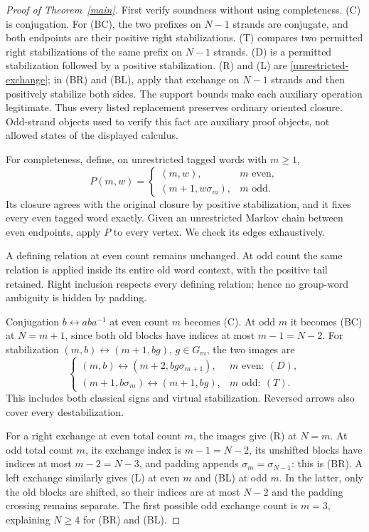 \documentclass[11pt]{article}
\newcommand{\sig}{\sigma}
\newcommand{\arr}{\longleftrightarrow}
\begin{document}
\begin{proof}[Proof of Theorem~\ref{main}]
First verify soundness without using completeness. (C) is conjugation.
For (BC), the two prefixes on $N-1$ strands are conjugate, and both endpoints
are their positive right stabilizations. (T) compares two permitted right
stabilizations of the same prefix on $N-1$ strands. (D) is a permitted
stabilization followed by a positive stabilization. (R) and (L) are
\eqref{unrestricted-exchange}; in (BR) and (BL), apply that exchange on
$N-1$ strands and then positively stabilize both sides. The support bounds make
each auxiliary operation legitimate. Thus every listed replacement preserves
ordinary oriented closure. Odd-strand objects used to verify this fact are
auxiliary proof objects, not allowed states of the displayed calculus.

For completeness, define, on unrestricted tagged words with $m\ge1$,
\begin{equation}\label{padding}
 P(m,w)=
 \begin{cases}
 (m,w),&m\text{ even},\\
 (m+1,w\sig_m),&m\text{ odd}.
 \end{cases}
\end{equation}
Its closure agrees with the original closure by positive stabilization, and it
fixes every even tagged word exactly. Given an unrestricted Markov chain between
even endpoints, apply $P$ to every vertex. We check its edges exhaustively.

A defining relation at even count remains unchanged. At odd count the same
relation is applied inside its entire old word context, with the positive tail
retained. Right inclusion respects every defining relation; hence no group-word
ambiguity is hidden by padding.

Conjugation $b\arr aba^{-1}$ at even count $m$ becomes (C).
At odd $m$ it becomes (BC) at $N=m+1$, since both old blocks have indices
at most $m-1=N-2$.
For stabilization $(m,b)\arr(m+1,bg)$, $g\in G_m$, the two images are
\[
 \begin{cases}
 (m,b)\arr(m+2,bg\sig_{m+1}),&m\text{ even}:\ (D),\\
 (m+1,b\sig_m)\arr(m+1,bg),&m\text{ odd}:\ (T).
 \end{cases}
\]
This includes both classical signs and virtual stabilization. Reversed arrows
also cover every destabilization.

For a right exchange at even total count $m$, the images give (R) at $N=m$.
At odd total count $m$, its exchange index is $m-1=N-2$, its unshifted blocks
have indices at most $m-2=N-3$, and padding appends $\sig_m=\sig_{N-1}$:
this is (BR). A left exchange similarly gives (L) at even $m$ and (BL) at odd
$m$. In the latter, only the old blocks are shifted, so their indices are at
most $N-2$ and the padding crossing remains separate. The first possible odd
exchange count is $m=3$, explaining $N\ge4$ for (BR) and (BL).


\end{proof}
\end{document}
